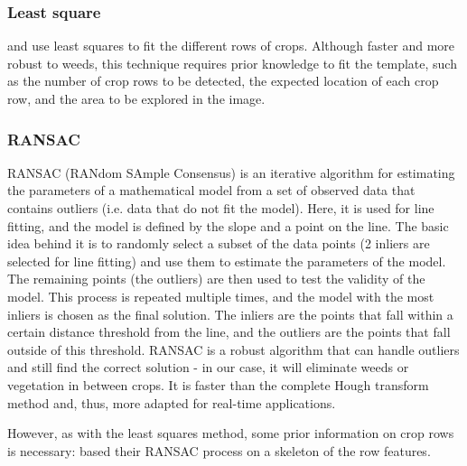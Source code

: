 \subsubsection{Least square}

\citet{LeastSquares2} and \citet{LeastSquares} use least squares to fit the different rows of crops. Although faster and more robust to weeds, this technique requires prior knowledge to fit the template, such as the number of crop rows to be detected, the expected location of each crop row, and the area to be explored in the image. \\


\subsubsection{RANSAC}

RANSAC (RANdom SAmple Consensus) is an iterative algorithm for estimating the parameters of a mathematical model from a set of observed data that contains outliers (i.e. data that do not fit the model). Here, it is used for line fitting, and the model is defined by the slope and a point on the line. The basic idea behind it is to randomly select a subset of the data points (2 inliers are selected for line fitting) and use them to estimate the parameters of the model. The remaining points (the outliers) are then used to test the validity of the model. This process is repeated multiple times, and the model with the most inliers is chosen as the final solution. The inliers are the points that fall within a certain distance threshold from the line, and the outliers are the points that fall outside of this threshold. RANSAC is a robust algorithm that can handle outliers and still find the correct solution - in our case, it will eliminate weeds or vegetation in between crops. It is faster than the complete Hough transform method and, thus, more adapted for real-time applications.


However, as with the least squares method, some prior information on crop rows is necessary: \citet{RANSACbase} based their RANSAC process on a skeleton of the row features. \\ \\ \\ \\

